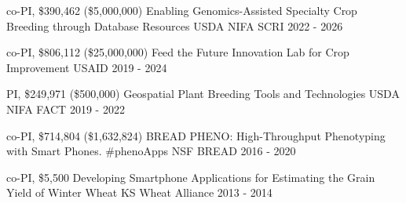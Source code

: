 \begin{cvgrants}

  \cvgrant
    {co-PI, \$390,462 (\$5,000,000)}
    {Enabling Genomics-Assisted Specialty Crop Breeding through Database Resources}
    {USDA NIFA SCRI} %
    {2022 - 2026}
    {
    }

  \cvgrant
    {co-PI, \$806,112 (\$25,000,000)}
    {Feed the Future Innovation Lab for Crop Improvement}
    {USAID} %
    {2019 - 2024}
    {
    }

  \cvgrant
    {PI, \$249,971 (\$500,000)} %
    {Geospatial Plant Breeding Tools and Technologies}
    {USDA NIFA FACT} %
    {2019 - 2022}
    {
    }

  \cvgrant
    {co-PI, \$714,804 (\$1,632,824)} %
    {BREAD PHENO: High-Throughput Phenotyping with Smart Phones. \#phenoApps}
    {NSF BREAD} %
    {2016 - 2020}
    {
    }

  \cvgrant
    {co-PI, \$5,500} %
    {Developing Smartphone Applications for Estimating the Grain Yield of Winter Wheat}
    {KS Wheat Alliance}
    {2013 - 2014}
    {
    }

\end{cvgrants}
